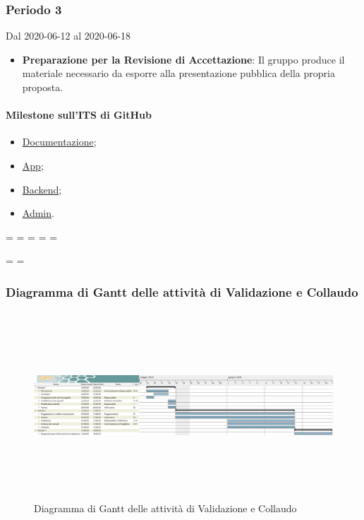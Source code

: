 \subsubsection{Periodo 3} 
Dal 2020-06-12 al 2020-06-18
\begin{itemize}
	\item \textbf{Preparazione per la Revisione di Accettazione}: Il gruppo produce il materiale necessario da esporre alla presentazione pubblica della propria proposta.
\end{itemize}
\paragraph{Milestone sull'ITS di GitHub}
\begin{itemize}
	\item \href{https://github.com/qb-team/Stalker-Documentazione/milestone/17}{Documentazione};
	\item \href{https://github.com/qb-team/Stalker-App/milestone/6}{App};
	\item \href{https://github.com/qb-team/Stalker-Backend/milestone/7}{Backend};
	\item \href{https://github.com/qb-team/Stalker-Admin/milestone/7}{Admin}.
\end{itemize}

\newpage
\paperwidth=\pdfpageheight
\paperheight=\pdfpagewidth
\pdfpageheight=\paperheight
\pdfpagewidth=\paperwidth
\headwidth=\textheight

\begingroup 
\vsize=\textwidth
\hsize=\textheight

\subsubsection{Diagramma di Gantt delle attività di Validazione e Collaudo}
\pagestyle{empty}
\begin{figure}[h]
	\centering
	\includegraphics[height = 7cm, width = 24.5cm]{Sezioni/Immagini/DiagrammiGantt/Validazione.png}
	\caption{Diagramma di Gantt delle attività di Validazione e Collaudo}
\end{figure}

